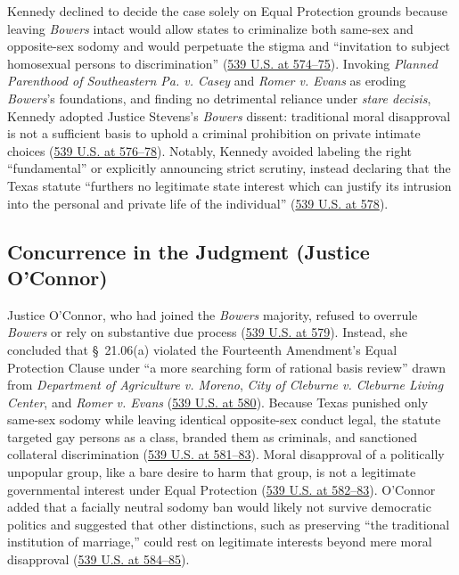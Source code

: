 \documentclass[12pt]{article}
\begin{document}
Kennedy declined to decide the case solely on Equal Protection grounds because leaving \textit{Bowers} intact would allow states to criminalize both same-sex and opposite-sex sodomy and would perpetuate the stigma and ``invitation to subject homosexual persons to discrimination'' (\href{https://www.law.cornell.edu/supremecourt/text/02-102}{539 U.S. at 574--75}). Invoking \textit{Planned Parenthood of Southeastern Pa. v. Casey} and \textit{Romer v. Evans} as eroding \textit{Bowers}'s foundations, and finding no detrimental reliance under \textit{stare decisis}, Kennedy adopted Justice Stevens's \textit{Bowers} dissent: traditional moral disapproval is not a sufficient basis to uphold a criminal prohibition on private intimate choices (\href{https://www.law.cornell.edu/supremecourt/text/02-102}{539 U.S. at 576--78}). Notably, Kennedy avoided labeling the right ``fundamental'' or explicitly announcing strict scrutiny, instead declaring that the Texas statute ``furthers no legitimate state interest which can justify its intrusion into the personal and private life of the individual'' (\href{https://www.law.cornell.edu/supremecourt/text/02-102}{539 U.S. at 578}).

\subsection{Concurrence in the Judgment (Justice O'Connor)}
Justice O'Connor, who had joined the \textit{Bowers} majority, refused to overrule \textit{Bowers} or rely on substantive due process (\href{https://www.law.cornell.edu/supremecourt/text/02-102}{539 U.S. at 579}). Instead, she concluded that \S~21.06(a) violated the Fourteenth Amendment's Equal Protection Clause under ``a more searching form of rational basis review'' drawn from \textit{Department of Agriculture v. Moreno}, \textit{City of Cleburne v. Cleburne Living Center}, and \textit{Romer v. Evans} (\href{https://www.law.cornell.edu/supremecourt/text/02-102}{539 U.S. at 580}). Because Texas punished only same-sex sodomy while leaving identical opposite-sex conduct legal, the statute targeted gay persons as a class, branded them as criminals, and sanctioned collateral discrimination (\href{https://www.law.cornell.edu/supremecourt/text/02-102}{539 U.S. at 581--83}). Moral disapproval of a politically unpopular group, like a bare desire to harm that group, is not a legitimate governmental interest under Equal Protection (\href{https://www.law.cornell.edu/supremecourt/text/02-102}{539 U.S. at 582--83}). O'Connor added that a facially neutral sodomy ban would likely not survive democratic politics and suggested that other distinctions, such as preserving ``the traditional institution of marriage,'' could rest on legitimate interests beyond mere moral disapproval (\href{https://www.law.cornell.edu/supremecourt/text/02-102}{539 U.S. at 584--85}).
\end{document}
